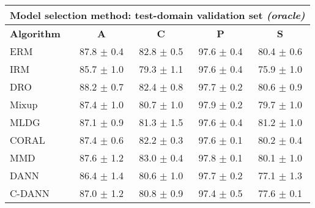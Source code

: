 \documentclass{article}
\begin{document}
\begin{center}
\begin{tabular}{lcccc}
\toprule
\multicolumn{5}{c}{\textbf{Model selection method: test-domain validation set \textit{(oracle)}}} \\
\midrule
\textbf{Algorithm}    & \textbf{A}                & \textbf{C}                & \textbf{P}                & \textbf{S}                \\
\midrule
ERM                       & 87.8 $\pm$ 0.4            & 82.8 $\pm$ 0.5            & 97.6 $\pm$ 0.4            & 80.4 $\pm$ 0.6            \\
IRM                       & 85.7 $\pm$ 1.0            & 79.3 $\pm$ 1.1            & 97.6 $\pm$ 0.4            & 75.9 $\pm$ 1.0            \\
DRO                 & 88.2 $\pm$ 0.7            & 82.4 $\pm$ 0.8            & 97.7 $\pm$ 0.2            & 80.6 $\pm$ 0.9            \\
Mixup                     & 87.4 $\pm$ 1.0            & 80.7 $\pm$ 1.0            & 97.9 $\pm$ 0.2            & 79.7 $\pm$ 1.0            \\
MLDG                      & 87.1 $\pm$ 0.9            & 81.3 $\pm$ 1.5            & 97.6 $\pm$ 0.4            & 81.2 $\pm$ 1.0            \\
CORAL                     & 87.4 $\pm$ 0.6            & 82.2 $\pm$ 0.3            & 97.6 $\pm$ 0.1            & 80.2 $\pm$ 0.4            \\
MMD                       & 87.6 $\pm$ 1.2            & 83.0 $\pm$ 0.4            & 97.8 $\pm$ 0.1            & 80.1 $\pm$ 1.0            \\
DANN                       & 86.4 $\pm$ 1.4            & 80.6 $\pm$ 1.0            & 97.7 $\pm$ 0.2            & 77.1 $\pm$ 1.3            \\
C-DANN                   & 87.0 $\pm$ 1.2            & 80.8 $\pm$ 0.9            & 97.4 $\pm$ 0.5            & 77.6 $\pm$ 0.1            \\
\bottomrule
\end{tabular}
\end{center}

\clearpage
\newpage
\end{document}
